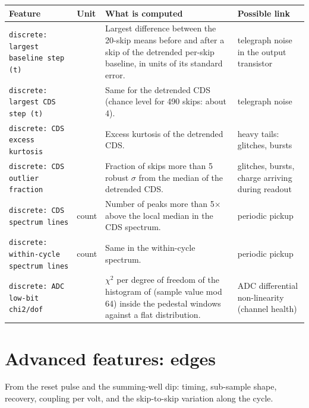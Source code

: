 \documentclass[10pt]{article}
\begin{document}
\begin{longtable}{>{\raggedright\arraybackslash}p{}>{\raggedright\arraybackslash}p{}>{\raggedright\arraybackslash}p{}>{\raggedright\arraybackslash}p{}}
\toprule Feature & Unit & What is computed & Possible link \\ \midrule \endhead
\bottomrule \endfoot
\texttt{discrete: largest baseline step (t)} &  & Largest difference between the 20-skip means before and after a skip of the detrended per-skip baseline, in units of its standard error. & telegraph noise in the output transistor \\
\texttt{discrete: largest CDS step (t)} &  & Same for the detrended CDS (chance level for 490 skips: about 4). & telegraph noise \\
\texttt{discrete: CDS excess kurtosis} &  & Excess kurtosis of the detrended CDS. & heavy tails: glitches, bursts \\
\texttt{discrete: CDS outlier fraction} &  & Fraction of skips more than 5 robust $\sigma$ from the median of the detrended CDS. & glitches, bursts, charge arriving during readout \\
\texttt{discrete: CDS spectrum lines} & count & Number of peaks more than 5$\times$ above the local median in the CDS spectrum. & periodic pickup \\
\texttt{discrete: within-cycle spectrum lines} & count & Same in the within-cycle spectrum. & periodic pickup \\
\texttt{discrete: ADC low-bit chi2/dof} &  & $\chi$$^{2}$ per degree of freedom of the histogram of (sample value mod 64) inside the pedestal windows against a flat distribution. & ADC differential non-linearity (channel health) \\
\end{longtable}

\section{Advanced features: edges}
From the reset pulse and the summing-well dip: timing, sub-sample shape, recovery, coupling per volt, and the skip-to-skip variation along the cycle.
\end{document}
